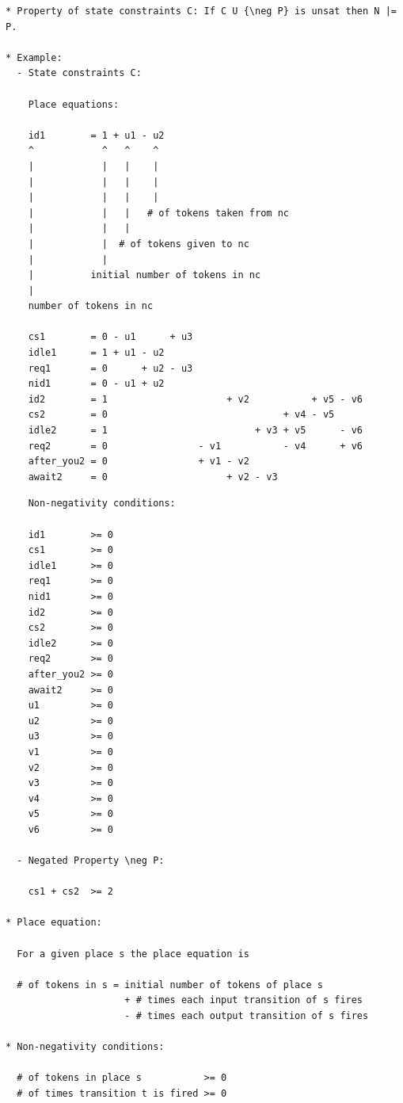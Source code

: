 \documentclass{article}
\begin{document}
\begin{verbatim}
* Property of state constraints C: If C U {\neg P} is unsat then N |= P.

* Example:
  - State constraints C:

    Place equations:
  
    id1        = 1 + u1 - u2
    ^            ^   ^    ^
    |            |   |    |
    |            |   |    |
    |            |   |    |
    |            |   |   # of tokens taken from nc
    |            |   |    
    |            |  # of tokens given to nc
    |            |
    |          initial number of tokens in nc
    |
    number of tokens in nc

    cs1        = 0 - u1      + u3
    idle1      = 1 + u1 - u2
    req1       = 0      + u2 - u3
    nid1       = 0 - u1 + u2
    id2        = 1                     + v2           + v5 - v6
    cs2        = 0                               + v4 - v5
    idle2      = 1                          + v3 + v5      - v6
    req2       = 0                - v1           - v4      + v6
    after_you2 = 0                + v1 - v2
    await2     = 0                     + v2 - v3
\end{verbatim}

\newpage

\begin{verbatim}
    Non-negativity conditions:
  
    id1        >= 0
    cs1        >= 0
    idle1      >= 0
    req1       >= 0
    nid1       >= 0
    id2        >= 0
    cs2        >= 0
    idle2      >= 0
    req2       >= 0
    after_you2 >= 0
    await2     >= 0
    u1         >= 0
    u2         >= 0
    u3         >= 0
    v1         >= 0
    v2         >= 0
    v3         >= 0
    v4         >= 0
    v5         >= 0
    v6         >= 0

  - Negated Property \neg P:

    cs1 + cs2  >= 2

* Place equation:
  
  For a given place s the place equation is

  # of tokens in s = initial number of tokens of place s
                     + # times each input transition of s fires
                     - # times each output transition of s fires

* Non-negativity conditions:

  # of tokens in place s           >= 0
  # of times transition t is fired >= 0
\end{verbatim}
\end{document}
